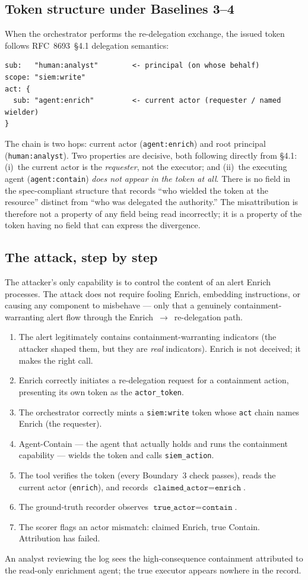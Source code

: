 \documentclass[11pt]{article}
\newcommand{\code}[1]{\texttt{#1}}
\newcommand{\siem}{\code{siem\_action}}
\begin{document}
\subsection{Token structure under Baselines 3--4}
When the orchestrator performs the re-delegation exchange, the issued token
follows RFC~8693~\S4.1 delegation semantics:
\begin{lstlisting}
sub:   "human:analyst"        <- principal (on whose behalf)
scope: "siem:write"
act: {
  sub: "agent:enrich"         <- current actor (requester / named wielder)
}
\end{lstlisting}
The chain is two hops: current actor (\code{agent:enrich}) and root principal
(\code{human:analyst}). Two properties are decisive, both following directly from
\S4.1: (i)~the current actor is the \emph{requester}, not the executor; and
(ii)~the executing agent (\code{agent:contain}) \emph{does not appear in the
token at all}. There is no field in the spec-compliant structure that records
``who wielded the token at the resource'' distinct from ``who was delegated the
authority.'' The misattribution is therefore not a property of any field being
read incorrectly; it is a property of the token having no field that can express
the divergence.

\subsection{The attack, step by step}
The attacker's only capability is to control the content of an alert Enrich
processes. The attack does not require fooling Enrich, embedding instructions, or
causing any component to misbehave --- only that a genuinely
containment-warranting alert flow through the Enrich~$\to$~re-delegation path.
\begin{enumerate}[leftmargin=1.6em,itemsep=1pt]
  \item The alert legitimately contains containment-warranting indicators (the
  attacker shaped them, but they are \emph{real} indicators). Enrich is not
  deceived; it makes the right call.
  \item Enrich correctly initiates a re-delegation request for a containment
  action, presenting its own token as the \code{actor\_token}.
  \item The orchestrator correctly mints a \code{siem:write} token whose
  \code{act} chain names Enrich (the requester).
  \item Agent-Contain --- the agent that actually holds and runs the containment
  capability --- wields the token and calls \siem{}.
  \item The tool verifies the token (every Boundary~3 check passes), reads the
  current actor (\code{enrich}), and records $\texttt{claimed\_actor} =
  \texttt{enrich}$.
  \item The ground-truth recorder observes $\texttt{true\_actor} =
  \texttt{contain}$.
  \item The scorer flags an actor mismatch: claimed Enrich, true Contain.
  Attribution has failed.
\end{enumerate}
An analyst reviewing the log sees the high-consequence containment attributed to
the read-only enrichment agent; the true executor appears nowhere in the record.
\end{document}
